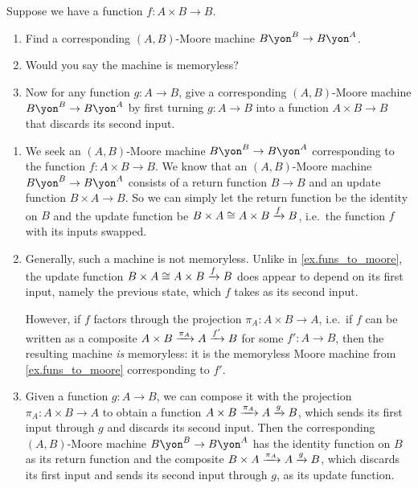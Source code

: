 \documentclass[Book-Poly]{subfiles}
\begin{document}
\begin{exercise}\label{exc.funs_to_moore}
Suppose we have a function $f\colon A\times B\to B$.
\begin{enumerate}
	\item Find a corresponding $(A,B)$-Moore machine $B\yon^B\to B\yon^A$.
	\item Would you say the machine is memoryless?
	\item Now for any function $g\colon A\to B$, give a corresponding $(A,B)$-Moore machine $B\yon^B\to B\yon^A$ by first turning $g\colon A\to B$ into a function $A\times B\to B$ that discards its second input.
\qedhere
\end{enumerate}
\begin{solution}
\begin{enumerate}
    \item We seek an $(A,B)$-Moore machine $B\yon^B\to B\yon^A$ corresponding to the function $f\colon A\times B\to B$.
    We know that an $(A,B)$-Moore machine $B\yon^B \to B\yon^A$ consists of a return function $B \to B$ and an update function $B \times A \to B$.
    So we can simply let the return function be the identity on $B$ and the update function be $B \times A \cong A \times B \xrightarrow{f} B$, i.e.\ the function $f$ with its inputs swapped.

    \item Generally, such a machine is not memoryless.
    Unlike in \cref{ex.funs_to_moore}, the update function $B \times A \cong A \times B \xrightarrow{f} B$ does appear to depend on its first input, namely the previous state, which $f$ takes as its second input.

    However, if $f$ factors through the projection $\pi_A \colon A \times B \to A$, i.e.\ if $f$ can be written as a composite $A \times B \xrightarrow{\pi_A} A \xrightarrow{f'} B$ for some $f' \colon A \to B$, then the resulting machine \emph{is} memoryless: it is the memoryless Moore machine from \cref{ex.funs_to_moore} corresponding to $f'$.

    \item Given a function $g\colon A\to B$, we can compose it with the projection $\pi_A\colon A\times B\to A$ to obtain a function $A\times B\xrightarrow{\pi_A}A\xrightarrow{g}B$, which sends its first input through $g$ and discards its second input.
    Then the corresponding $(A,B)$-Moore machine $B\yon^B \to B\yon^A$ has the identity function on $B$ as its return function and the composite $B\times A\xrightarrow{\pi_A}A\xrightarrow{g}B$, which discards its first input and sends its second input through $g$, as its update function.
\end{enumerate}
\end{solution}
\end{exercise}
\end{document}

